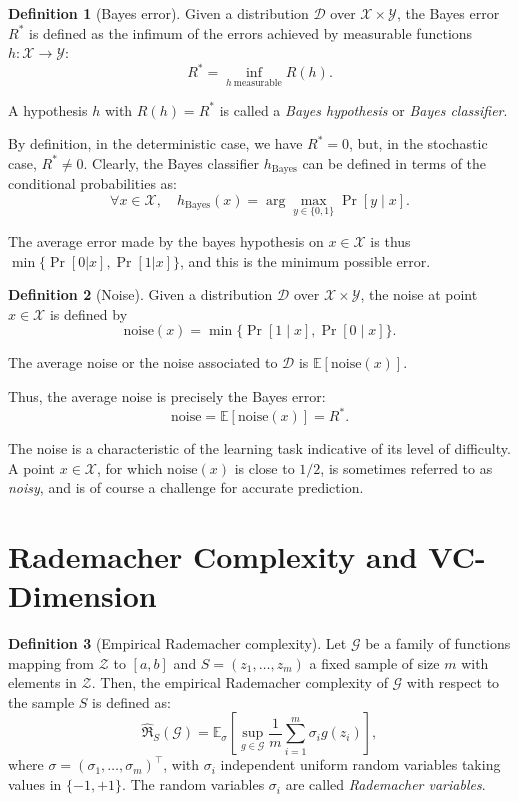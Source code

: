 \documentclass[12pt]{article}
\theoremstyle{definition} %
\newtheorem{definition}{Definition}[section]
\theoremstyle{plain} %
\theoremstyle{remark} %
\begin{document}
\begin{CJK}{UTF8}{gbsn}
\begin{definition}[Bayes error]
Given a distribution $\mathcal{D}$ over $\mathcal{X} \times \mathcal{Y}$, 
the Bayes error $R^*$ is defined as the infimum of the errors achieved by measurable functions 
$h: \mathcal{X} \to \mathcal{Y}$:
\[
R^* = \inf_{h \ \text{measurable}} R(h). \tag{2.22}
\]

A hypothesis $h$ with $R(h) = R^*$ is called a \emph{Bayes hypothesis} or \emph{Bayes classifier}.

By definition, in the deterministic case, we have $R^* = 0$, but, in the stochastic case, 
$R^* \neq 0$. Clearly, the Bayes classifier $h_{\text{Bayes}}$ can be defined in terms of the 
conditional probabilities as:
\[
\forall x \in \mathcal{X}, \quad 
h_{\text{Bayes}}(x) = \arg\max_{y \in \{0,1\}} \Pr[y \mid x]. \tag{2.23}
\]

The average error made by the bayes hypothesis on $x\in\mathcal{X}$ is thus $\min\{\Pr[0|x],\Pr[1|x]\}$, 
and this is the minimum possible error.

\end{definition}

\begin{definition}[Noise]
Given a distribution $\mathcal{D}$ over $\mathcal{X} \times \mathcal{Y}$, 
the noise at point $x \in \mathcal{X}$ is defined by
\[
\mathrm{noise}(x) = \min\{\Pr[1 \mid x], \Pr[0 \mid x]\}. \tag{2.24}
\]

The average noise or the noise associated to $\mathcal{D}$ is 
$\mathbb{E}[\mathrm{noise}(x)]$.

Thus, the average noise is precisely the Bayes error: 
\[
\mathrm{noise} = \mathbb{E}[\mathrm{noise}(x)] = R^*.
\]

The noise is a characteristic of the learning task indicative of its level of difficulty. 
A point $x \in \mathcal{X}$, for which $\mathrm{noise}(x)$ is close to $1/2$, is sometimes referred to as \emph{noisy}, 
and is of course a challenge for accurate prediction.
\end{definition}


\section{Rademacher Complexity and VC-Dimension}

\begin{definition}[Empirical Rademacher complexity]
Let $\mathcal{G}$ be a family of functions mapping from $\mathcal{Z}$ to $[a,b]$ and 
$S = (z_1, \ldots, z_m)$ a fixed sample of size $m$ with elements in $\mathcal{Z}$. 
Then, the empirical Rademacher complexity of $\mathcal{G}$ with respect to the sample $S$ 
is defined as:
\[
\hat{\mathfrak{R}}_S(\mathcal{G}) = \mathbb{E}_{\sigma} \left[ 
\sup_{g \in \mathcal{G}} \frac{1}{m} \sum_{i=1}^m \sigma_i g(z_i)
\right], \tag{3.1}
\]
where $\sigma = (\sigma_1, \ldots, \sigma_m)^\top$, with $\sigma_i$ independent uniform 
random variables taking values in $\{-1,+1\}$. The random variables $\sigma_i$ are 
called \emph{Rademacher variables}.


\end{definition}
\end{CJK}
\end{document}
